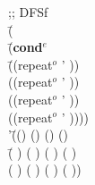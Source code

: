     \begin{ZZZZschemedisplay}%
;; DFSf\\%
\va{$\gt$} \=(  \\%
  \>\PRN \HL \=(\textbf{cond$^e$}\\%
  \>  \>\PRN \HL \=((repeat$^o$ ' ))\\%
  \>  \>  \>((repeat$^o$ ' ))\\%
  \>  \>  \>((repeat$^o$ ' ))\\%
  \>  \>  \>((repeat$^o$ ' ))))\\%
'\=(() () () ()\\%
 \>\PRN \=( ) ( ) ( ) ( )\\%
 \> \>(  ) (  ) (  ) (  ))%
\end{ZZZZschemedisplay}
    